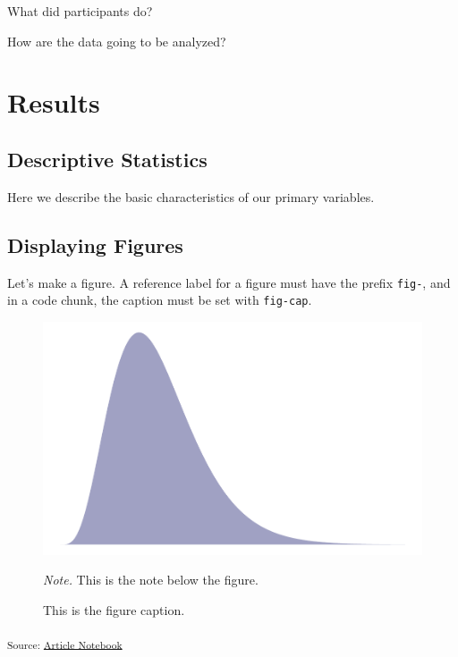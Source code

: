 \documentclass[
  man,
  floatsintext,
  longtable,
  colorlinks=true,linkcolor=blue,citecolor=blue,urlcolor=blue]{apa7}
\begin{document}
What did participants do?

How are the data going to be analyzed?

\section{Results}\label{results}

\subsection{Descriptive Statistics}\label{descriptive-statistics}

Here we describe the basic characteristics of our primary variables.

\subsection{Displaying Figures}\label{displaying-figures}

Let's make a figure. A reference label for a figure must have the prefix
\texttt{fig-}, and in a code chunk, the caption must be set with
\texttt{fig-cap}.

\label{cell-fig-myplot}
\begin{figure}[H]

{\caption{{This is the figure caption.}{\label{fig-myplot}}}}

\includegraphics{index_files/figure-pdf/fig-myplot-1.pdf}

{\noindent \emph{Note.} This is the note below the figure.}

\end{figure}

\textsubscript{Source:
\href{https://mavrxlab.github.io/project-template/index.qmd.html}{Article
Notebook}}
\end{document}
